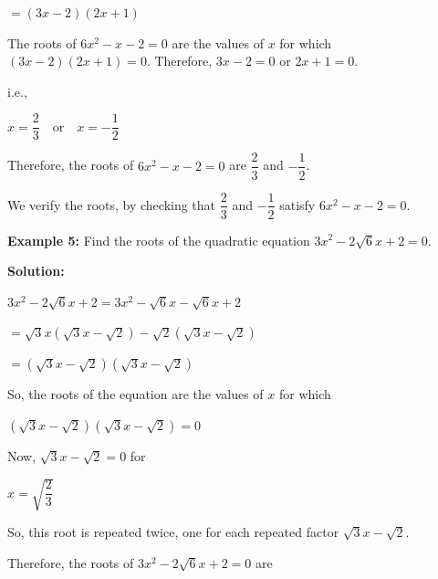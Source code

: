\documentclass[11pt]{article}
\begin{document}
\begin{center}
$= (3x - 2)(2x + 1)$
\end{center}
The roots of $6x^2 - x - 2 = 0$ are the values of $x$ for which  
$(3x - 2)(2x + 1) = 0$.
Therefore, $3x - 2 = 0$ or $2x + 1 = 0$.

\medskip

i.e.,

\begin{center}
$x = \dfrac{2}{3} \quad \text{or} \quad x = -\dfrac{1}{2}$
\end{center}

Therefore, the roots of $6x^2 - x - 2 = 0$ are
$\dfrac{2}{3}$ and $-\dfrac{1}{2}$.

\medskip
We verify the roots, by checking that $\dfrac{2}{3}$ and $-\dfrac{1}{2}$
satisfy $6x^2 - x - 2 = 0$.

\medskip
\noindent\textcolor{chapterblue}{\textbf{Example 5:}}
Find the roots of the quadratic equation $3x^2 - 2\sqrt{6}x + 2 = 0$.

\medskip

\noindent\textcolor{chapterblue}{\textbf{Solution:}}

\begin{center}
$3x^2 - 2\sqrt{6}x + 2
= 3x^2 - \sqrt{6}x - \sqrt{6}x + 2$
\end{center}

\begin{center}
$= \sqrt{3}x(\sqrt{3}x - \sqrt{2}) -
\sqrt{2}(\sqrt{3}x - \sqrt{2})$
\end{center}

\begin{center}
$= (\sqrt{3}x - \sqrt{2})(\sqrt{3}x - \sqrt{2})$
\end{center}

So, the roots of the equation are the values of $x$ for which

\begin{center}
$(\sqrt{3}x - \sqrt{2})(\sqrt{3}x - \sqrt{2}) = 0$
\end{center}

Now, $\sqrt{3}x - \sqrt{2} = 0$ for

\begin{center}
$x = \sqrt{\dfrac{2}{3}}$
\end{center}

So, this root is repeated twice, one for each repeated factor
$\sqrt{3}x - \sqrt{2}$.

\medskip

Therefore, the roots of $3x^2 - 2\sqrt{6}x + 2 = 0$ are
\end{document}
